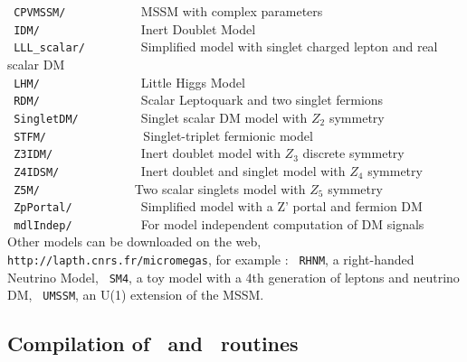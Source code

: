 \documentclass[12pt,a4paper]{article}
\begin{document}
\verb| CPVMSSM/           |         MSSM with complex parameters\cite{Lee:2003nta,  Belanger:2006qa} \\
\verb| IDM/               |         Inert Doublet Model\cite{Barbieri:2006dq}  \\
\verb| LLL_scalar/        | Simplified model with singlet charged lepton and real scalar DM \\ 
\verb| LHM/               |         Little Higgs Model\cite{Belyaev:2006jh} \\
\verb| RDM/               |  Scalar Leptoquark and two singlet fermions\cite{Belanger:2021smw} \\
\verb| SingletDM/         | Singlet scalar DM model with $Z_2$ symmetry \cite{McDonald:2001vt} \\ 
\verb| STFM/               |Singlet-triplet fermionic model \cite{Alguero:2022inz}\\ 
\verb| Z3IDM/             |        Inert doublet model  with $Z_3$ discrete
symmetry \cite{Belanger:2012vp,Belanger:2014bga} \\
\verb| Z4IDSM/            |         Inert doublet and singlet model with $Z_4$
symmetry \cite{Belanger:2012vp,Belanger:2014bga} \\  
\verb| Z5M/              |       Two scalar singlets model with $Z_5$
symmetry \cite{Belanger:2020hyh} \\  
\verb| ZpPortal/          | Simplified model with a Z' portal  and fermion DM  \\ 
\verb| mdlIndep/          |           For model independent computation of DM signals                                 \\












Other models can be downloaded on the  web,  \verb|http://lapth.cnrs.fr/micromegas|, for example :
\verb| RHNM|, a right-handed Neutrino Model\cite{Belanger:2007dx},          
\verb| SM4|, a toy model with a 4th generation of leptons and neutrino DM, 
\verb| UMSSM|, an   U(1) extension of the MSSM\cite{DaSilva:2013jga,Belanger:2015cra}.


\subsection{Compilation of \calchep\ and \micro\ routines}
\end{document}

